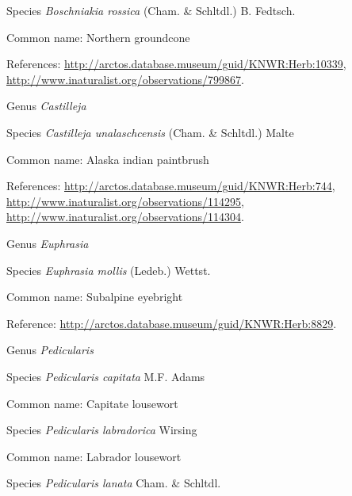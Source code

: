 \documentclass[9pt, article]{memoir}
\begin{document}
\begin{multicols}{2}
\vspace{6pt}\noindent\hspace{36pt}Species \textit{Boschniakia rossica} (Cham. \& Schltdl.) B. Fedtsch.


Common name: Northern groundcone

References: 
\url{http://arctos.database.museum/guid/KNWR:Herb:10339}, 
\url{http://www.inaturalist.org/observations/799867}.

\vspace{6pt}\noindent\hspace{30pt}Genus \textit{Castilleja}


\vspace{6pt}\noindent\hspace{36pt}Species \textit{Castilleja unalaschcensis} (Cham. \& Schltdl.) Malte


Common name: Alaska indian paintbrush

References: 
\url{http://arctos.database.museum/guid/KNWR:Herb:744}, 
\url{http://www.inaturalist.org/observations/114295}, 
\url{http://www.inaturalist.org/observations/114304}.

\vspace{6pt}\noindent\hspace{30pt}Genus \textit{Euphrasia}


\vspace{6pt}\noindent\hspace{36pt}Species \textit{Euphrasia mollis} (Ledeb.) Wettst.


Common name: Subalpine eyebright

Reference: 
\url{http://arctos.database.museum/guid/KNWR:Herb:8829}.

\vspace{6pt}\noindent\hspace{30pt}Genus \textit{Pedicularis}


\vspace{6pt}\noindent\hspace{36pt}Species \textit{Pedicularis capitata} M.F. Adams


Common name: Capitate lousewort

\vspace{6pt}\noindent\hspace{36pt}Species \textit{Pedicularis labradorica} Wirsing


Common name: Labrador lousewort

\vspace{6pt}\noindent\hspace{36pt}Species \textit{Pedicularis lanata} Cham. \& Schltdl.



\end{multicols}
\end{document}
